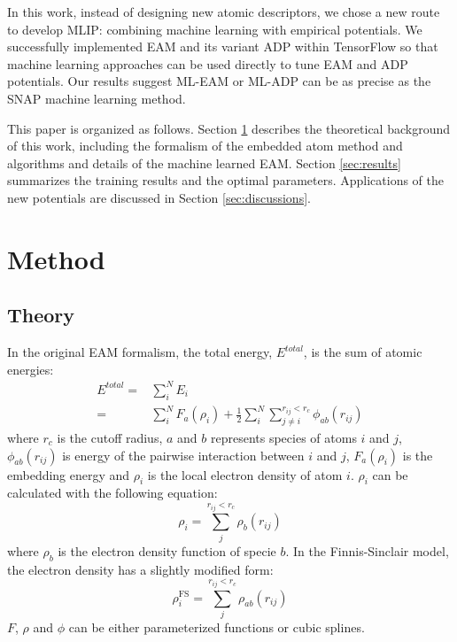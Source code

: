 \documentclass[prb,reprint]{revtex4-2}
\begin{document}
In this work, instead of designing new atomic descriptors, we chose a new route 
to develop MLIP: combining machine learning with empirical potentials. We 
successfully implemented EAM and its variant ADP within TensorFlow so that 
machine learning approaches can be used directly to tune EAM and ADP potentials. 
Our results suggest ML-EAM or ML-ADP can be as precise as the SNAP machine 
learning method. 

This paper is organized as follows. Section \ref{sec:method} describes the 
theoretical background of this work, including the formalism of the embedded 
atom method and algorithms and details of the machine learned EAM. 
Section \ref{sec:results} summarizes the training results and the optimal 
parameters. Applications of the new potentials are discussed in 
Section \ref{sec:discussions}.

% 
%
\section{Method}
\label{sec:method}


\subsection{Theory}
\label{sec:theory}

In the original EAM formalism, the total energy, $E^{total}$, is the sum of 
atomic energies:
\begin{align}
E^{total} = & \sum_{i}^{N}{E_{i}} \nonumber \\
\label{eq:eam_total_energy}
= & \sum_{i}^{N}{F_{a}(\rho_i)} + 
    \frac{1}{2}\sum_{i}^{N}{\sum_{j \neq i}^{r_{ij} < r_c}{
    \phi_{ab}(r_{ij})
}}
\end{align}
where $r_c$ is the cutoff radius, $a$ and $b$ represents species of atoms $i$ 
and $j$, $\phi_{ab}(r_{ij})$ is energy of the pairwise interaction between $i$ 
and $j$, $F_{a}(\rho_{i})$ is the embedding energy and $\rho_{i}$ is the local 
electron density of atom $i$. $\rho_{i}$ can be calculated with the following 
equation:
\begin{equation}
\label{eq:rho_eam}
\rho_{i} = \sum_{j}^{r_{ij} < r_{c}}{
    \rho_{b}(r_{ij})
}
\end{equation}
where $\rho_{b}$ is the electron density function of specie $b$. In the 
Finnis-Sinclair model, the electron density has a slightly modified form:
\begin{equation}
\label{eq:rho_fs}
\rho_{i}^{\mathrm{FS}} = \sum_{j}^{r_{ij} < r_{c}}{
    \rho_{ab}(r_{ij})
}
\end{equation}
$F$, $\rho$ and $\phi$ can be either parameterized functions or cubic splines.
\end{document}
